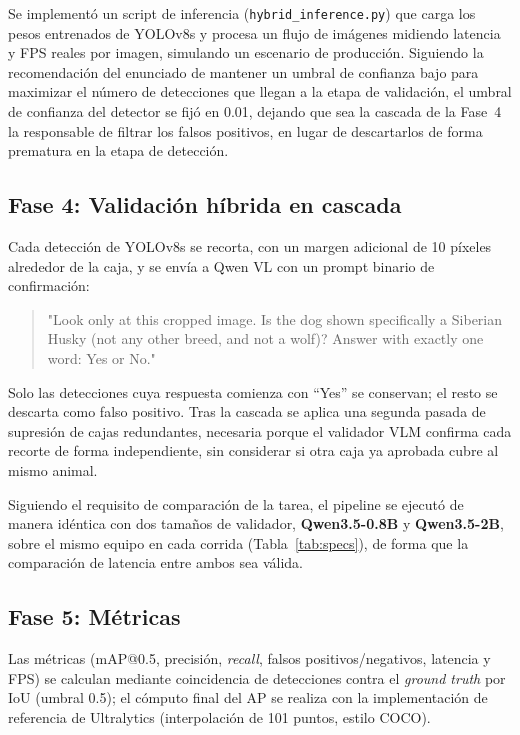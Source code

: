 \documentclass[11pt]{article}
\begin{document}
Se implementó un script de inferencia (\texttt{hybrid\_inference.py}) que carga los pesos
entrenados de YOLOv8s y procesa un flujo de imágenes midiendo latencia y FPS reales por imagen,
simulando un escenario de producción. Siguiendo la recomendación del enunciado de mantener un
umbral de confianza bajo para maximizar el número de detecciones que llegan a la etapa de
validación, el umbral de confianza del detector se fijó en 0.01, dejando que sea la cascada de
la Fase~4 la responsable de filtrar los falsos positivos, en lugar de descartarlos de forma
prematura en la etapa de detección.

\subsection{Fase 4: Validación híbrida en cascada}
\label{sec:fase4}

Cada detección de YOLOv8s se recorta, con un margen adicional de 10 píxeles alrededor de la
caja, y se envía a Qwen VL con un prompt binario de confirmación:

\begin{quote}
\small\ttfamily "Look only at this cropped image. Is the dog shown specifically a Siberian
Husky (not any other breed, and not a wolf)? Answer with exactly one word: Yes or No."
\end{quote}

Solo las detecciones cuya respuesta comienza con ``Yes'' se conservan; el resto se descarta
como falso positivo. Tras la cascada se aplica una segunda pasada de supresión de cajas
redundantes, necesaria porque el validador VLM confirma cada recorte de forma independiente,
sin considerar si otra caja ya aprobada cubre al mismo animal.

Siguiendo el requisito de comparación de la tarea, el pipeline se ejecutó de manera idéntica con
dos tamaños de validador, \textbf{Qwen3.5-0.8B} y \textbf{Qwen3.5-2B}, sobre el mismo equipo en
cada corrida (Tabla~\ref{tab:specs}), de forma que la comparación de latencia entre ambos sea
válida.

\subsection{Fase 5: Métricas}

Las métricas (mAP@0.5, precisión, \textit{recall}, falsos positivos/negativos, latencia y FPS)
se calculan mediante coincidencia de detecciones contra el \textit{ground truth} por IoU (umbral
0.5); el cómputo final del AP se realiza con la implementación de referencia de Ultralytics
(interpolación de 101 puntos, estilo COCO).
\end{document}
